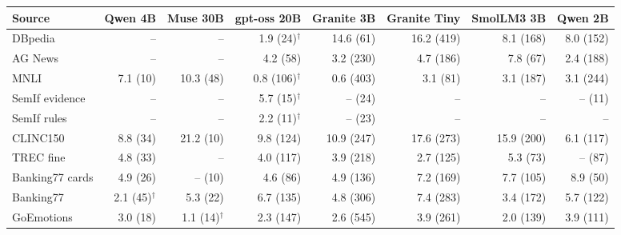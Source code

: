 \begin{tabular}{@{}lrrrrrrr@{}}
\toprule
Source & Qwen 4B & Muse 30B & gpt-oss 20B & Granite 3B & Granite Tiny & SmolLM3 3B & Qwen 2B \\
\midrule
DBpedia & -- & -- & 1.9 (24)$^{\dagger}$ & 14.6 (61) & 16.2 (419) & 8.1 (168) & 8.0 (152) \\
AG News & -- & -- & 4.2 (58) & 3.2 (230) & 4.7 (186) & 7.8 (67) & 2.4 (188) \\
MNLI & 7.1 (10) & 10.3 (48) & 0.8 (106)$^{\dagger}$ & 0.6 (403) & 3.1 (81) & 3.1 (187) & 3.1 (244) \\
SemIf evidence & -- & -- & 5.7 (15)$^{\dagger}$ & -- (24) & -- & -- & -- (11) \\
SemIf rules & -- & -- & 2.2 (11)$^{\dagger}$ & -- (23) & -- & -- & -- \\
CLINC150 & 8.8 (34) & 21.2 (10) & 9.8 (124) & 10.9 (247) & 17.6 (273) & 15.9 (200) & 6.1 (117) \\
TREC fine & 4.8 (33) & -- & 4.0 (117) & 3.9 (218) & 2.7 (125) & 5.3 (73) & -- (87) \\
Banking77 cards & 4.9 (26) & -- (10) & 4.6 (86) & 4.9 (136) & 7.2 (169) & 7.7 (105) & 8.9 (50) \\
Banking77 & 2.1 (45)$^{\dagger}$ & 5.3 (22) & 6.7 (135) & 4.8 (306) & 7.4 (283) & 3.4 (172) & 5.7 (122) \\
GoEmotions & 3.0 (18) & 1.1 (14)$^{\dagger}$ & 2.3 (147) & 2.6 (545) & 3.9 (261) & 2.0 (139) & 3.9 (111) \\
\bottomrule
\end{tabular}
